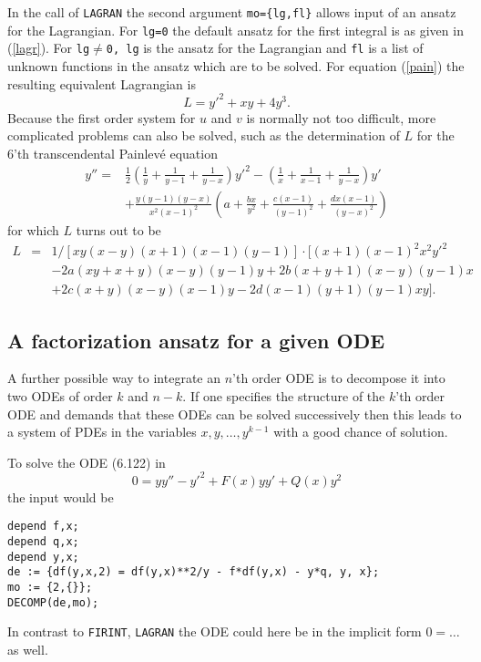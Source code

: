   In the call of {\tt LAGRAN} the second argument {\tt mo=\{lg,fl\}} allows
input of an ansatz for the Lagrangian.
For {\tt lg=0} the default ansatz for the first integral is as given in
(\ref{lagr}).
For {\tt lg$\neq$0, lg} is the ansatz for the Lagrangian and {\tt fl} is a
list of unknown functions in the ansatz which are to be solved.
For equation (\ref{pain}) the resulting equivalent Lagrangian is
\[ L = y'^2 + xy + 4y^3. \]
Because the first order system for $u$ and $v$ is normally not too
difficult, more complicated problems can also be solved, such as the
determination of $L$ for the 6'th transcendental Painlev\'{e} equation
\begin{eqnarray}
 y'' = & \frac{1}{2}\left(\frac{1}{y}+\frac{1}{y-1}+\frac{1}{y-x}\right) y'^2
- \left(\frac{1}{x}+\frac{1}{x-1}+\frac{1}{y-x}\right)y'  \nonumber \\
& + \frac{y(y-1)(y-x)}{x^2(x-1)^2}\left(a+\frac{bx}{y^2}+\frac{c(x-1)}{(y-1)^2}
+\frac{dx(x-1)}{(y-x)^2}\right)
\end{eqnarray}
for which $L$ turns out to be
\[
\begin{array}{rcll}
L & = & 1/[xy(x-y)(x+1)(x-1)(y-1)] \cdot [(x+1)(x-1)^2x^2y'^2  \\
  &   & - 2a(xy+x+y)(x-y)(y-1)y + 2b(x+y+1)(x-y)(y-1)x \\
  &   & + 2c(x+y)(x-y)(x-1)y  - 2d(x-1)(y+1)(y-1)xy ].
\end{array} \]

\subsection{A factorization ansatz for a given ODE}
A further possible way to integrate an $n$'th order ODE is to decompose it
into two ODEs of order $k$ and $n-k$. If one specifies the structure of the
$k$'th order ODE and demands that these ODEs can be solved successively then
this leads to a system of PDEs in the variables
$x, y, \ldots, y^{k-1}$ with a good chance of solution.

To solve the ODE (6.122) in \cite{Ka}
\begin{equation}
0 = yy'' - y'^2 + F(x)yy' + Q(x)y^2       \label{6.122}
\end{equation}
the input would be
\begin{verbatim}
depend f,x;
depend q,x;
depend y,x;
de := {df(y,x,2) = df(y,x)**2/y - f*df(y,x) - y*q, y, x};
mo := {2,{}};
DECOMP(de,mo);
\end{verbatim}
In contrast to {\tt FIRINT}, {\tt LAGRAN} the ODE could here
be in the implicit form $0 = \ldots \;$ as well.

